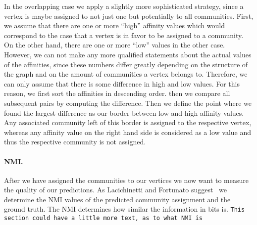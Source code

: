 In the overlapping case we apply a slightly more sophisticated strategy, since a vertex is maybe assigned to not just one but potentially to all communities. First, we assume that there are one or more ``high'' affinity values which would correspond to the 
case that a vertex is in favor to be assigned to a community. On the other hand, there are one or more ``low'' values in the other case. However, we can not make any more qualified statements about the actual values of the affinities, since these numbers differ greatly depending on the structure of the graph and on the amount of communities a vertex belongs to. Therefore, we can only assume that there is some difference in high and low values. For this reason, we first sort the affinities in descending order. then we compare all subsequent pairs by computing the difference. Then we define the point where we found the largest difference as our border between low and high affinity values. Any associated community left of this border is assigned to the respective vertex, whereas any affinity value on the right hand side is considered as a low value and thus the respective community is not assigned.

\paragraph{NMI.}
After we have assigned the communities to our vertices we now want to measure 
the quality of our predictions. As Lacichinetti and Fortunato 
suggest~\cite{LF09} we determine the NMI values of the predicted community 
assignment and the ground truth. The NMI determines how similar the 
information in bits is. \texttt{This section could have a little more text, as to what NMI is}
